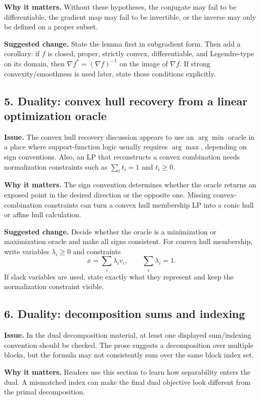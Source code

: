\documentclass[11pt]{article}
\begin{document}
\textbf{Why it matters.}  Without these hypotheses, the conjugate may fail to be differentiable, the gradient map may fail to be invertible, or the inverse may only be defined on a proper subset.

\textbf{Suggested change.}  State the lemma first in subgradient form.  Then add a corollary: if \(f\) is closed, proper, strictly convex, differentiable, and Legendre-type on its domain, then \(\nabla f^\ast=(\nabla f)^{-1}\) on the image of \(\nabla f\).  If strong convexity/smoothness is used later, state those conditions explicitly.

\subsection*{5. Duality: convex hull recovery from a linear optimization oracle}

\textbf{Issue.}  The convex hull recovery discussion appears to use an \(\arg\min\) oracle in a place where support-function logic usually requires \(\arg\max\), depending on sign conventions.  Also, an LP that reconstructs a convex combination needs normalization constraints such as \(\sum_i t_i=1\) and \(t_i\ge 0\).

\textbf{Why it matters.}  The sign convention determines whether the oracle returns an exposed point in the desired direction or the opposite one.  Missing convex-combination constraints can turn a convex hull membership LP into a conic hull or affine hull calculation.

\textbf{Suggested change.}  Decide whether the oracle is a minimization or maximization oracle and make all signs consistent.  For convex hull membership, write variables \(\lambda_i\ge 0\) and constraints
\[
x=\sum_i \lambda_i v_i,\qquad \sum_i\lambda_i=1.
\]
If slack variables are used, state exactly what they represent and keep the normalization constraint visible.

\subsection*{6. Duality: decomposition sums and indexing}

\textbf{Issue.}  In the dual decomposition material, at least one displayed sum/indexing convention should be checked.  The prose suggests a decomposition over multiple blocks, but the formula may not consistently sum over the same block index set.

\textbf{Why it matters.}  Readers use this section to learn how separability enters the dual.  A mismatched index can make the final dual objective look different from the primal decomposition.
\end{document}
